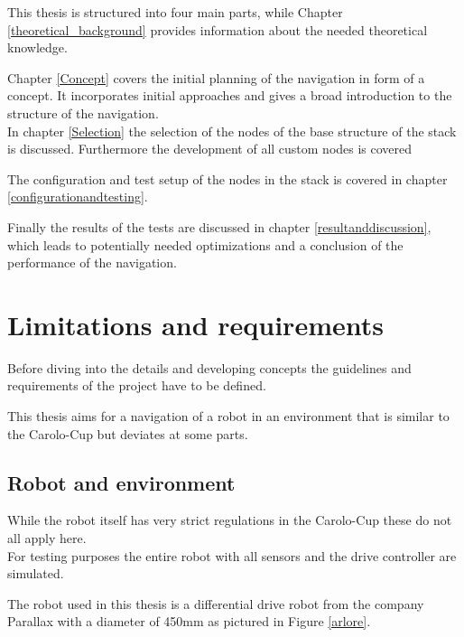 This thesis is structured into four main parts, while Chapter \ref{theoretical_background} provides information about the needed theoretical knowledge.


Chapter \ref{Concept} covers the initial planning of the navigation in form of a concept. It incorporates initial approaches and gives a broad introduction to the structure of the navigation.\\

In chapter \ref{Selection} the selection of the nodes of the base structure of the stack is discussed. Furthermore the development of all custom nodes is covered

The configuration and test setup of the nodes in the stack is covered in chapter \ref{configurationandtesting}.


Finally the results of the tests are discussed in chapter \ref{resultanddiscussion}, which leads to potentially needed optimizations and a conclusion of the performance of the navigation.

\section{Limitations and requirements}

Before diving into the details and developing concepts the guidelines and requirements of the project have to be defined.

This thesis aims for a navigation of a robot in an environment that is similar to the Carolo-Cup but deviates at some parts.

\subsection{Robot and environment}
While the robot itself has very strict regulations in the Carolo-Cup these do not all apply here.\\

For testing purposes the entire robot with all sensors and the drive controller are simulated.

The robot used in this thesis is a differential drive robot from the company Parallax with a diameter of 450mm as pictured in Figure \ref{arlore}.\\

